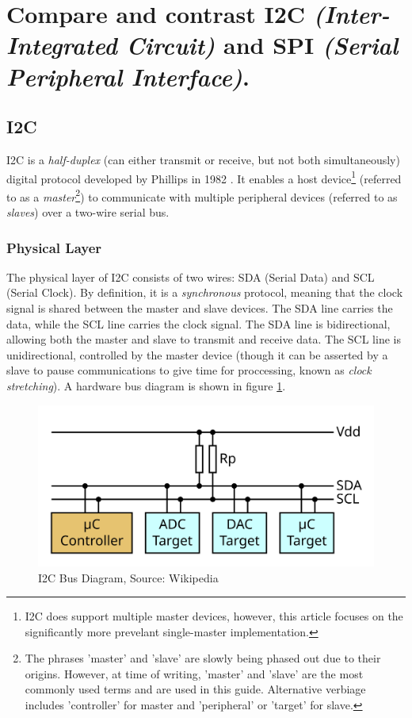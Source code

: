 \documentclass[main.tex]{subfiles}
\begin{document}
\section{Compare and contrast I2C \textit{(Inter-Integrated Circuit)} and SPI \textit{(Serial Peripheral Interface)}.} \label{section:compare_i2c_spi} %
\spoilerline

\subsection{I2C}
I2C is a \textit{half-duplex} (can either transmit or receive, but not both simultaneously) digital protocol developed by Phillips in 1982 \cite{sparkfun_i2c_history}. It enables a host device\footnote{I2C does support multiple master devices, however, this article focuses on the significantly more prevelant single-master implementation.} (referred to as a \textit{master}\footnote{The phrases 'master' and 'slave' are slowly being phased out due to their origins. However, at time of writing, 'master' and 'slave' are the most commonly used terms and are used in this guide. Alternative verbiage includes 'controller' for master and 'peripheral' or 'target' for slave.}) to communicate with multiple peripheral devices (referred to as \textit{slaves}) over a two-wire serial bus. 

\subsubsection{Physical Layer}
The physical layer of I2C consists of two wires: SDA (Serial Data) and SCL (Serial Clock). By definition, it is a \textit{synchronous} protocol, meaning that the clock signal is shared between the master and slave devices. The SDA line carries the data, while the SCL line carries the clock signal. The SDA line is bidirectional, allowing both the master and slave to transmit and receive data. The SCL line is unidirectional, controlled by the master device (though it can be asserted by a slave to pause communications to give time for proccessing, known as \textit{clock stretching}). A hardware bus diagram is shown in figure \ref{fig:i2c_bus}.

\begin{figure}[H]
    \centering
    \includegraphics[scale=0.09]{images/I2C_controller-target.png}
    \caption{I2C Bus Diagram, Source: Wikipedia \cite{wikipedia_i2c_bus_image}}
    \label{fig:i2c_bus}
\end{figure}
\end{document}
